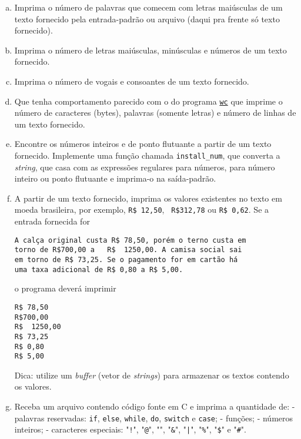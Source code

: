\begin{enumerate}[a)]
\item Imprima o número de palavras que comecem com letras maiúsculas
  de um texto fornecido pela entrada-padrão ou arquivo (daqui pra
  frente só texto fornecido).

\item Imprima o número de letras maiúsculas, minúsculas e números de
  um texto fornecido.

\item Imprima o número de vogais e consoantes de um texto fornecido.

\item Que tenha comportamento parecido com o do programa
  \href{https://pt.wikipedia.org/wiki/Wc}{\tt wc} que imprime o número
        de caracteres (bytes), palavras (somente letras) 
        e número de linhas de um texto fornecido.

\item Encontre os números inteiros e de ponto flutuante a partir de um 
texto fornecido. Implemente uma função chamada {\tt install\_num}, 
que converta a {\it string\/}, que casa com as expressões regulares para números, 
para número inteiro ou ponto flutuante e imprima-o na saída-padrão.

\item A partir de um texto fornecido, imprima os valores existentes no
  texto em moeda brasileira, por exemplo, {\tt R\$ 12,50}, {\tt
    R\$312,78} ou {\tt R\$ 0,62}.  Se a entrada fornecida for

\begin{verbatim}
A calça original custa R$ 78,50, porém o terno custa em
torno de R$700,00 a   R$  1250,00. A camisa social sai
em torno de R$ 73,25. Se o pagamento for em cartão há
uma taxa adicional de R$ 0,80 a R$ 5,00.
\end{verbatim}

o programa deverá imprimir

\begin{verbatim}
R$ 78,50
R$700,00
R$  1250,00
R$ 73,25
R$ 0,80
R$ 5,00
\end{verbatim}

Dica: utilize um {\it buffer\/} (vetor de {\it strings\/}) para
armazenar os textos contendo os valores.

\item Receba um arquivo contendo código fonte em C e imprima a quantidade de:
    - palavras reservadas: {\tt if}, {\tt else}, {\tt while}, {\tt do}, {\tt switch} e {\tt case};
    - funções;
    - números inteiros;
    - caracteres especiais: "{\tt !}", "{\tt @}", "{\tt *}", "{\tt \&}", "{\tt |}", "{\tt \%}", "{\tt \$}" e "{\tt \#}".


\end{enumerate}
